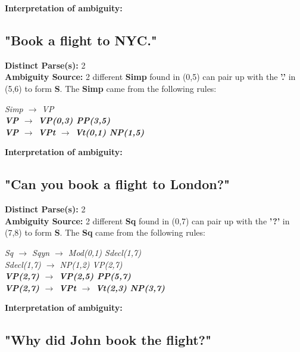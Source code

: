 \documentclass{article}
\begin{document}
\textbf{Interpretation of ambiguity:}\\

\subsection{"Book a flight to NYC."}

\textbf{Distinct Parse(s):} 2\\

\textbf{Ambiguity Source:} 2 different \textbf{Simp} found in (0,5) can pair up with the \textbf{'.'} in (5,6) to form \textbf{S}. The \textbf{Simp} came from the following rules:

\begin{center}
	\emph{Simp $\rightarrow$ VP}\\
	\textbf{\emph{VP $\rightarrow$ VP(0,3) PP(3,5)}\\
	\emph{VP $\rightarrow$ VPt $\rightarrow$ Vt(0,1) NP(1,5)}}
\end{center}

\textbf{Interpretation of ambiguity:}\\

\subsection{"Can you book a flight to London?"}

\textbf{Distinct Parse(s):} 2\\

\textbf{Ambiguity Source:} 2 different \textbf{Sq} found in (0,7) can pair up with the \textbf{'?'} in (7,8) to form \textbf{S}. The \textbf{Sq} came from the following rules:

\begin{center}
	\emph{Sq $\rightarrow$ Sqyn $\rightarrow$ Mod(0,1) Sdecl(1,7)}\\
	\emph{Sdecl(1,7) $\rightarrow$ NP(1,2) VP(2,7)}\\
	\textbf{\emph{VP(2,7) $\rightarrow$ VP(2,5) PP(5,7)}\\
	\emph{VP(2,7) $\rightarrow$ VPt $\rightarrow$ Vt(2,3) NP(3,7)}}
\end{center}

\textbf{Interpretation of ambiguity:}\\

\subsection{"Why did John book the flight?"}
\end{document}
